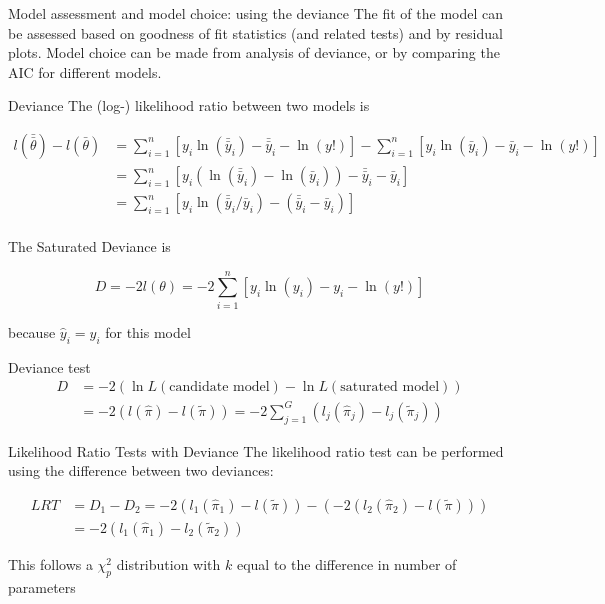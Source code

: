 \documentclass[
  ignorenonframetext,
]{beamer}
\begin{document}
\begin{frame}{Model assessment and model choice: using the deviance}
\protect\hypertarget{model-assessment-and-model-choice-using-the-deviance}{}
The fit of the model can be assessed based on goodness of fit statistics
(and related tests) and by residual plots. Model choice can be made from
analysis of deviance, or by comparing the AIC for different models.
\end{frame}

\begin{frame}
\begin{block}{Deviance}
\protect\hypertarget{deviance-1}{}
The (log-) likelihood ratio between two models is

\[
\begin{aligned}
l(\bar{\bar{\theta}}) - l(\bar{\theta}) &=\sum_{i=1}^n [y_i \ln(\bar{\bar{y}}_i)-\bar{\bar{y}}_i-\ln(y!)] - \sum_{i=1}^n [y_i \ln(\bar{y}_i)-\bar{y}_i-\ln(y!)] \\
&= \sum_{i=1}^n [y_i \left(\ln(\bar{\bar{y}}_i) - \ln(\bar{y}_i) \right)-\bar{\bar{y}}_i-\bar{y}_i] \\
&= \sum_{i=1}^n [y_i \ln(\bar{\bar{y}}_i/\bar{y}_i)- (\bar{\bar{y}}_i-\bar{y}_i)] \\
\end{aligned}
\]

The Saturated Deviance is

\[
D = -2 l(\theta)=-2\sum_{i=1}^n [y_i \ln(y_i)-y_i-\ln(y!)] 
\]

because \(\hat{y}_i = y_i\) for this model
\end{block}
\end{frame}

\begin{frame}{Deviance test}
\protect\hypertarget{deviance-test}{}
\[
\begin{aligned}
D&=-2(\ln L(\text{candidate model})-\ln L(\text{saturated model})) \\
&=-2(l(\hat{\pi})-l(\tilde{\pi}))=
-2\sum_{j=1}^G(l_j(\hat{\pi}_j)-l_j(\tilde{\pi}_j))
\end{aligned}
\]
\end{frame}

\begin{frame}
\begin{block}{Likelihood Ratio Tests with Deviance}
\protect\hypertarget{likelihood-ratio-tests-with-deviance}{}
The likelihood ratio test can be performed using the difference between
two deviances:

\[
\begin{aligned}
LRT &= D_1 - D_2 =-2(l_1(\hat{\pi}_1)-l(\tilde{\pi})) - (-2(l_2(\hat{\pi}_2)-l(\tilde{\pi}))) \\
&=-2(l_1(\hat{\pi}_1)-l_2(\tilde{\pi}_2))
\end{aligned}
\]

This follows a \(\chi^2_p\) distribution with \(k\) equal to the
difference in number of parameters
\end{block}
\end{frame}
\end{document}
